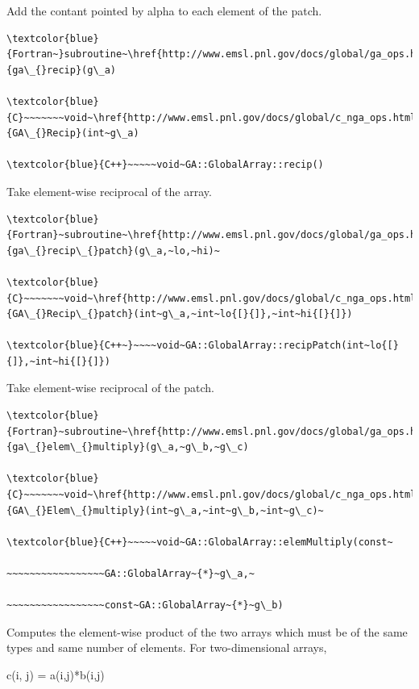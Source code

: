 Add the contant pointed by alpha to each element of the patch. 
\begin{verbatim}
\textcolor{blue}{Fortran~}subroutine~\href{http://www.emsl.pnl.gov/docs/global/ga_ops.html\#ga_recip}{ga\_{}recip}(g\_a)

\textcolor{blue}{C}~~~~~~~void~\href{http://www.emsl.pnl.gov/docs/global/c_nga_ops.html\#ga_recip}{GA\_{}Recip}(int~g\_a)

\textcolor{blue}{C++}~~~~~void~GA::GlobalArray::recip()
\end{verbatim}
Take element-wise reciprocal of the array.
\begin{verbatim}
\textcolor{blue}{Fortran}~subroutine~\href{http://www.emsl.pnl.gov/docs/global/ga_ops.html\#ga_recip_patch}{ga\_{}recip\_{}patch}(g\_a,~lo,~hi)~

\textcolor{blue}{C}~~~~~~~void~\href{http://www.emsl.pnl.gov/docs/global/c_nga_ops.html\#ga_recip_patch}{GA\_{}Recip\_{}patch}(int~g\_a,~int~lo{[}{]},~int~hi{[}{]})

\textcolor{blue}{C++~}~~~~void~GA::GlobalArray::recipPatch(int~lo{[}{]},~int~hi{[}{]})
\end{verbatim}
Take element-wise reciprocal of the patch.
\begin{verbatim}
\textcolor{blue}{Fortran}~subroutine~\href{http://www.emsl.pnl.gov/docs/global/ga_ops.html\#ga_elem_multiply}{ga\_{}elem\_{}multiply}(g\_a,~g\_b,~g\_c)

\textcolor{blue}{C}~~~~~~~void~\href{http://www.emsl.pnl.gov/docs/global/c_nga_ops.html\#ga_elem_multiply}{GA\_{}Elem\_{}multiply}(int~g\_a,~int~g\_b,~int~g\_c)~

\textcolor{blue}{C++}~~~~~void~GA::GlobalArray::elemMultiply(const~

~~~~~~~~~~~~~~~~~GA::GlobalArray~{*}~g\_a,~

~~~~~~~~~~~~~~~~~const~GA::GlobalArray~{*}~g\_b)
\end{verbatim}
Computes the element-wise product of the two arrays which must be
of the same types and same number of elements. For two-dimensional
arrays,

c(i, j) = a(i,j){*}b(i,j)

